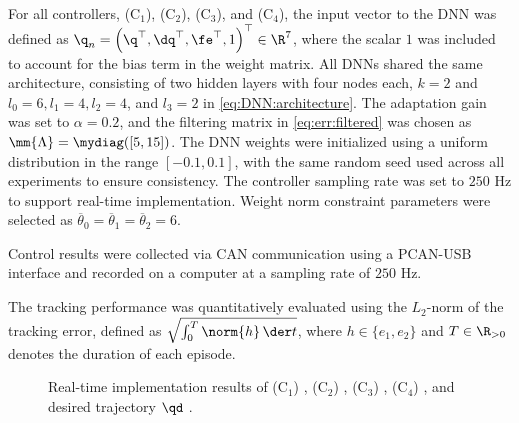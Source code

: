 \documentclass[journal]{IEEEtran}
\begin{document}
\hfill

For all controllers, \ie (C$_1$), (C$_2$), (C$_3$), and (C$_4$), the input vector to the DNN was defined as ${\q}_n=\left(\q^\top,\dq^\top,\fe^\top,1\right)^\top\in\R^{7}$, where the scalar $1$ was included to account for the bias term in the weight matrix.
All DNNs shared the same architecture, consisting of two hidden layers with four nodes each, \ie $k=2$ and $l_0=6, l_1=4, l_2=4$, and $l_3=2$ in \eqref{eq:DNN:architecture}.
The adaptation gain was set to $\alpha = 0.2$, and the filtering matrix in \eqref{eq:err:filtered} was chosen as $\mm{\Lambda}=\mydiag([5,15])$.
The DNN weights were initialized using a uniform distribution in the range $[-0.1, 0.1]$, with the same random seed used across all experiments to ensure consistency.
The controller sampling rate was set to $250$ Hz to support real-time implementation.
Weight norm constraint parameters were selected as $\overline\theta_0=\overline\theta_1=\overline\theta_2=6$.

Control results were collected via CAN communication using a PCAN-USB interface and recorded on a computer at a sampling rate of $250$ Hz.

The tracking performance was quantitatively evaluated using the $L_2$-norm of the tracking error, defined as $\sqrt{\int_0^T\norm{h}\,\der t}$, where $h\in\{e_1,e_2\}$ and $T\in\R_{>0}$ denotes the duration of each episode.

\begin{figure}[t]
  \centering
    \hfill
    \vfill
    \hfill
        \vfill
    \hfill
    \caption{
    Real-time implementation results of (C$_1$) \protect{}, (C$_2$) \protect{}, (C$_3$) \protect{}, (C$_4$) \protect{}, and desired trajectory $\qd$ \protect{}.
  }
\label{fig:ctrl:result}
\end{figure}
\end{document}
